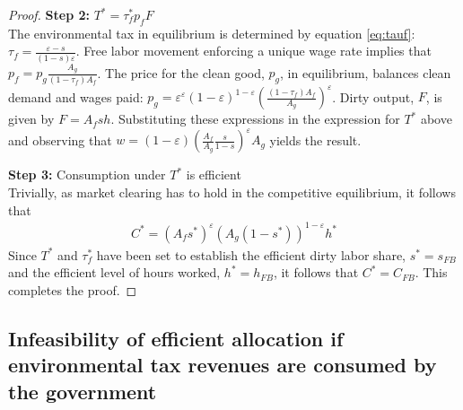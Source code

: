 \begin{proof}
	\textbf{Step 2:} $T^*=\tau_f^*p_fF$\\
	The environmental tax in equilibrium is determined by equation \ref{eq:tauf}: $\tau_f = \frac{\varepsilon-s}{(1-s)\varepsilon}$. Free labor movement enforcing a unique wage rate implies that $p_f=p_g\frac{A_g}{(1-\tau_f)A_f}$. The price for the clean good, $p_g$, in equilibrium, balances clean demand and wages paid: $p_g=\varepsilon^\varepsilon(1-\varepsilon)^{1-\varepsilon}\left(\frac{(1-\tau_f)A_f}{A_g}\right)^\varepsilon$. Dirty output, $F$, is given by $F=A_fsh$. 
	Substituting these expressions in the expression for $T^*$ above and observing that $w=(1-\varepsilon)\left(\frac{A_f}{A_g}\frac{s}{1-s}\right)^\varepsilon A_g$ yields the result.
	
	\textbf{Step 3: } Consumption under $T^*$ is efficient\\
	Trivially, as market clearing has to hold in the competitive equilibrium, it follows that 
	\begin{align}
	C^*=\left(A_f s^*\right)^\varepsilon\left(A_g(1-s^*)\right)^{1-\varepsilon}h^*
	\end{align} 
	Since $T^*$ and $\tau_f^*$ have been set to establish the efficient dirty labor share, $s^*=s_{FB}$ and the efficient level of hours worked, $h^*=h_{FB}$, it follows that $C^*=C_{FB}$. This completes the proof.
\end{proof}

\subsection{Infeasibility of efficient allocation if environmental tax revenues are consumed by the government}

